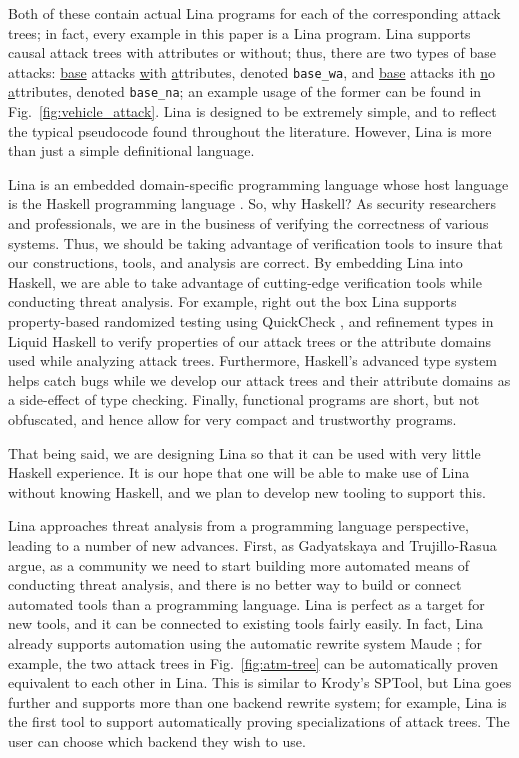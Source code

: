 Both of these contain actual Lina programs for each of the
corresponding attack trees; in fact, every example in this paper is a
Lina program. Lina supports causal attack trees with attributes or
without; thus, there are two types of base attacks: \underline{base}
attacks \underline{w}ith \underline{a}ttributes, denoted
\verb!base_wa!, and \underline{base} attacks ith
\underline{n}o \underline{a}ttributes, denoted \verb!base_na!; an
example usage of the former can be found in
Fig.~\ref{fig:vehicle_attack}.  Lina is designed to be extremely
simple, and to reflect the typical pseudocode found throughout the
literature.  However, Lina is more than just a simple definitional
language.

Lina is an embedded domain-specific programming language whose host
language is the Haskell programming language \cite{jones2003haskell}.
So, why Haskell?  As security researchers and professionals, we are in
the business of verifying the correctness of various systems. Thus, we
should be taking advantage of verification tools to insure that our
constructions, tools, and analysis are correct.  By embedding Lina
into Haskell, we are able to take advantage of cutting-edge
verification tools while conducting threat analysis.  For example,
right out the box Lina supports property-based randomized testing
using QuickCheck \cite{Claessen:2011:QLT:1988042.1988046}, and
refinement types in Liquid Haskell
\cite{Vazou:2014:RTH:2692915.2628161} to verify properties of our
attack trees or the attribute domains used while analyzing attack
trees.  Furthermore, Haskell's advanced type system helps catch bugs
while we develop our attack trees and their attribute domains as a
side-effect of type checking.  Finally, functional programs are short,
but not obfuscated, and hence allow for very compact and trustworthy
programs.

That being said, we are designing Lina so that it can be used with
very little Haskell experience.  It is our hope that one will be able
to make use of Lina without knowing Haskell, and we plan to develop
new tooling to support this.

Lina approaches threat analysis from a programming language
perspective, leading to a number of new advances.  First, as
Gadyatskaya and Trujillo-Rasua \cite{10.1007/978-3-319-74860-3_9}
argue, as a community we need to start building more automated means
of conducting threat analysis, and there is no better way to build or
connect automated tools than a programming language.  Lina is perfect
as a target for new tools, and it can be connected to existing tools
fairly easily.  In fact, Lina already supports automation using the
automatic rewrite system Maude \cite{clavel2005maude}; for example,
the two attack trees in Fig.~\ref{fig:atm-tree} can be automatically
proven equivalent to each other in Lina.  This is similar to Krody's
\cite{Kordy2017} SPTool, but Lina goes further and supports more than
one backend rewrite system; for example, Lina is the first tool to
support automatically proving specializations of attack trees.  The
user can choose which backend they wish to use.

